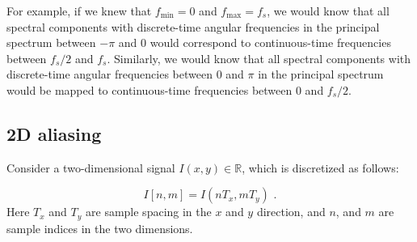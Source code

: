 For example, if we knew that $f_{\mathrm{min}} = 0$ and $f_{\mathrm{max}} = f_s$, we would know that all spectral components with discrete-time angular frequencies in the principal spectrum between $-\pi$ and $0$ would correspond to continuous-time frequencies between $f_s/2$ and $f_s$. Similarly, we would know that all spectral components with discrete-time angular frequencies between 0 and $\pi$ in the principal spectrum would be mapped to continuous-time frequencies between 0 and $f_s/2$.
\fi

\subsection{2D aliasing}
Consider a two-dimensional signal $I(x,y) \in \mathbb{R}$, which is discretized as follows:

\begin{equation}
I[n,m]=I(n T_x, m T_y)\,\,.
\end{equation}
Here $T_x$ and $T_y$ are sample spacing in the $x$ and $y$ direction, and $n$, and $m$ are sample indices in the two dimensions.

